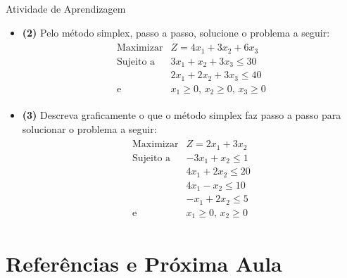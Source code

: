 \documentclass{if-beamer}
\begin{document}

\begin{frame}{Atividade de Aprendizagem}

\begin{itemize}
    \item \textbf{(2)} Pelo método simplex, passo a passo, solucione o problema a seguir:
    \begin{align*}
    \begin{matrix}
        \text{Maximizar} & Z = 4x_1 + 3x_2 + 6x_3 \\
        \text{Sujeito a} & 3x_1 + x_2 + 3x_3 \leq 30 \\
                         & 2x_1 + 2x_2 + 3x_3 \leq 40 \\
        \text{e}         & x_1 \geq 0 \text{, } x_2 \geq 0 \text{, } x_3 \geq 0
    \end{matrix}
    \end{align*}


    \item \textbf{(3)} Descreva graficamente o que o método simplex faz passo a passo para solucionar o problema a seguir:
    \begin{align*}
        \begin{matrix}
            \text{Maximizar} & Z = 2x_1 + 3x_2 \\
            \text{Sujeito a} & -3x_1 + x_2 \leq 1 \\
                             & 4x_1 + 2x_2 \leq 20 \\
                             & 4x_1 - x_2 \leq 10 \\
                             & -x_1 + 2x_2 \leq 5 \\
            \text{e}         & x_1 \geq 0 \text{, } x_2 \geq 0
        \end{matrix}
    \end{align*}
\end{itemize}

\end{frame}


\section{Referências e Próxima Aula}

\end{document}
